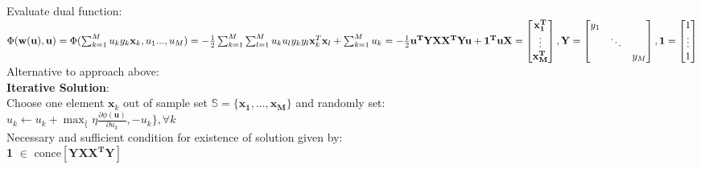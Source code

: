 \begin{sectionbox}
Evaluate dual function: \\
$\Phi(\mathbf{w(\mathbf{u})}, \mathbf{u}) = \Phi(\sum_{k=1}^{M}u_ky_k\mathbf{x}_k, u_1...,u_M) \\
= -\frac{1}{2}\sum_{k=1}^{M}\sum_{l=1}^{M}u_ku_ly_ky_l\mathbf{x}_k^T\mathbf{x}_l + \sum_{k=1}^{M}u_k \\
= -\frac{1}{2}\mathbf{u^T}\mathbf{YXX^TYu}+\mathbf{1^Tu} \\
\mathbf{X}= \begin{bmatrix}
\mathbf{x_1^T} \\
\vdots \\
\mathbf{x_M^T}
\end{bmatrix}, \mathbf{Y} =\begin{bmatrix}
y_1 & & \\
&\ddots &\\
& & y_M
\end{bmatrix}, \mathbf{1} = \begin{bmatrix}
 1\\
 \vdots\\
 1
\end{bmatrix} $ \\
Alternative to approach above: \\
\textbf{Iterative Solution}:\\
Choose one element $\mathbf{x}_k$ out of sample set $\mathbb{S}=\{\mathbf{x_1,...,x_M}\}$ and randomly set: \\
$ u_k\leftarrow u_k+\max_\{\eta\frac{\partial\phi(\mathbf{u})}{\partial u_k},-u_k\}, \forall k$ \\
Necessary and sufficient condition for existence of solution given by:\\ \textbf{1} $\in$ conce$[\mathbf{YXX^TY}]$
	


\end{sectionbox}
